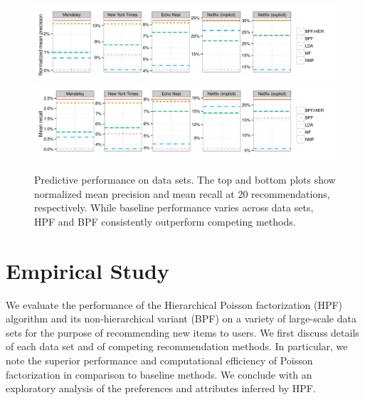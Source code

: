 \begin{figure}[t!]
\centering
\includegraphics[width=\textwidth]{figures/mean_precision_at_20.pdf}\\
\includegraphics[width=\textwidth]{figures/mean_recall_at_20.pdf}\\
\caption{Predictive performance on data sets. The top and bottom plots
  show normalized mean precision and mean recall at 20
  recommendations, respectively. While baseline performance varies
  across data sets, HPF and BPF consistently outperform competing
  methods.}
\label{fig:precision_recall}
\end{figure}


\section{Empirical Study}
We evaluate the performance of the Hierarchical Poisson factorization
(HPF) algorithm and its non-hierarchical variant (BPF) on a variety of
large-scale data sets for the purpose of recommending new items to
users. We first discuss details of each data set and of competing
recommendation methods. In particular, we note the superior
performance and computational efficiency of Poisson factorization in
comparison to baseline methods. We conclude with an exploratory
analysis of the preferences and attributes inferred by HPF.

